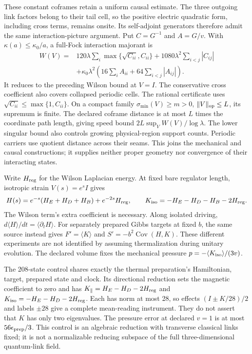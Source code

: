 These constant coframes retain a uniform causal estimate. The three
outgoing link factors belong to their tail cell, so the positive electric
quadratic form, including cross terms, remains onsite. Its self-adjoint generators therefore
admit the same interaction-picture argument. Put $C=G^{-1}$ and $A=G/v$.
With $\kappa(a)\le\kappa_0/a$, a full-Fock interaction majorant is
\[
 \begin{aligned}
 W(V)={}&120\lambda\sum_i\max\{\sqrt{C_{ii}},C_{ii}\}
         +1080\lambda^2\sum_{i<j}|C_{ij}|\\
       &+\kappa_0\lambda^2\left(16\sum_i A_{ii}
                         +64\sum_{i<j}|A_{ij}|\right).
 \end{aligned}
\]
It reduces to the preceding Wilson bound at $V=I$. The conservative
cross coefficient also covers collapsed periodic cells. The rational
certificate uses $\sqrt{C_{ii}}\le\max\{1,C_{ii}\}$. On a compact
family $\sigma_{\min}(V)\ge m>0$, $\|V\|_{\rm op}\le L$, its supremum is finite.
The declared coframe distance is at most $L$ times the coordinate path
length, giving speed bound $2L\sup_V W(V)/\log\lambda$.
The lower singular bound also controls growing physical-region support
counts. Periodic carriers use quotient distance across their seams. This joins
the mechanical and causal constructions; it supplies neither proper
geometry nor convergence of their interacting states.

Write $H_{\rm reg}$ for the Wilson Laplacian energy.
At fixed bare regulator length, isotropic strain $V(s)=e^sI$ gives
\[
 H(s)=e^{-s}(H_E+H_D+H_B)+e^{-2s}H_{\rm reg},\qquad
 K_{\rm iso}=-H_E-H_D-H_B-2H_{\rm reg}.
\]
The Wilson term's extra coefficient is necessary. Along isolated
driving, $d\langle H\rangle/dt=\langle\partial_tH\rangle$.
For separately prepared Gibbs targets at fixed $b$, the same source
instead gives $F'=\langle K\rangle$ and
$S'=-b^2\operatorname{Cov}(H,K)$. These different experiments are
not identified by assuming thermalization during unitary evolution.
The declared volume fixes the mechanical pressure
$p=-\langle K_{\rm iso}\rangle/(3v)$.

The 208-state control shares exactly the thermal preparation's Hamiltonian,
target, prepared state and clock. Its directional reduction sets the magnetic
coefficient to zero and has
$K_\parallel=H_E-H_D-2H_{\rm reg}$ and $K_{\rm iso}=-H_E-H_D-2H_{\rm reg}$.
Each has norm at most 28, so effects $(I\pm K/28)/2$ and labels
$\pm28$ give a complete mean-reading instrument. They do not assert
that $K$ has only two eigenvalues. The pressure error at declared
$v=1$ is at most $56\epsilon_{\rm prep}/3$. This control is an
algebraic reduction with transverse classical links fixed; it is not
a normalizable reducing subspace of the full three-dimensional
quantum-link field.

